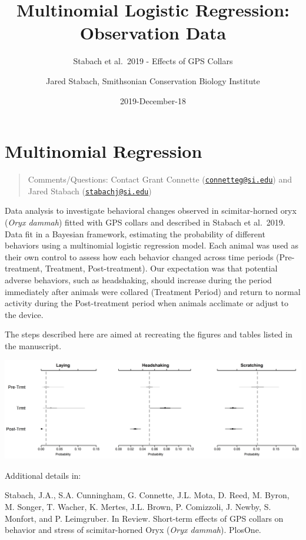 \documentclass[]{article}
\title{Multinomial Logistic Regression: Observation Data}
\subtitle{Stabach et al.~2019 - Effects of GPS Collars}
\author{Jared Stabach, Smithsonian Conservation Biology Institute}
\date{2019-December-18}
\begin{document}
\maketitle

{
\setcounter{tocdepth}{3}
\tableofcontents
}
\hypertarget{multinomial-regression}{%
\section{Multinomial Regression}\label{multinomial-regression}}

\begin{quote}
Comments/Questions: Contact Grant Connette
(\href{mailto:connetteg@si.edu}{\nolinkurl{connetteg@si.edu}}) and Jared
Stabach (\href{mailto:stabachj@si.edu}{\nolinkurl{stabachj@si.edu}})
\end{quote}

Data analysis to investigate behavioral changes observed in
scimitar-horned oryx (\emph{Oryx dammah}) fitted with GPS collars and
described in Stabach et al.~2019. Data fit in a Bayesian framework,
estimating the probability of different behaviors using a multinomial
logistic regression model. Each animal was used as their own control to
assess how each behavior changed across time periods (Pre-treatment,
Treatment, Post-treatment). Our expectation was that potential adverse
behaviors, such as headshaking, should increase during the period
immediately after animals were collared (Treatment Period) and return to
normal activity during the Post-treatment period when animals acclimate
or adjust to the device.

The steps described here are aimed at recreating the figures and tables
listed in the manuscript.

\includegraphics{PROBS_variables.png}

Additional details in:

Stabach, J.A., S.A. Cunningham, G. Connette, J.L. Mota, D. Reed, M.
Byron, M. Songer, T. Wacher, K. Mertes, J.L. Brown, P. Comizzoli, J.
Newby, S. Monfort, and P. Leimgruber. In Review. Short-term effects of
GPS collars on behavior and stress of scimitar-horned Oryx (\emph{Oryx
dammah}). PlosOne.
\end{document}
